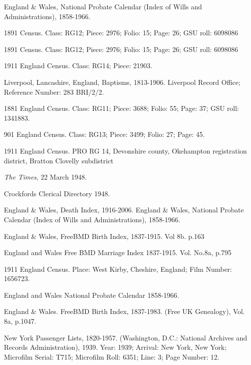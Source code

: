 \begin{thebibliography}{99}
	England \& Wales, National Probate Calendar (Index of Wills and Administrations), 1858-1966. 
	
	1891 Census.
	Class: RG12; Piece: 2976; Folio: 15; Page: 26; GSU roll: 6098086
	
	1891 Census. Class: RG12; Piece: 2976; Folio: 15; Page: 26; GSU roll: 6098086
	
	1911 England Census. Class: RG14; Piece: 21903.
	
	Liverpool, Lancashire, England, Baptisms, 1813-1906.
	Liverpool Record Office; Reference Number: 283 BRI/2/2.
	
	1881 England Census. Class: RG11; Piece: 3688; Folio: 55; Page: 37; GSU roll: 1341883.
	
	901 England Census. Class: RG13; Piece: 3499; Folio: 27; Page: 45.
	
	1911 England Census. PRO RG 14, Devonshire county, Okehampton registration district, 
	Bratton Clovelly subdistrict
	
	\emph{The Times}, 22 March 1948.

	 Crockfords Clerical Directory 1948. 
	 
	 England \& Wales, Death Index, 1916-2006.
	 England \& Wales, National Probate Calendar (Index of Wills and Administrations), 1858-1966. 
	 
	England \& Wales, FreeBMD Birth Index, 1837-1915. Vol 8b. p.163
	
	England and Wales Free BMD Marriage Index 1837-1915. Vol. No.8a, p.795
	
	1911 England Census. Place: West Kirby, Cheshire, England; Film Number: 1656723.

	England and Wales National Probate Calendar 1858-1966.
	
	England \& Wales. FreeBMD Birth Index, 1837-1983. (Free UK Genealogy), Vol. 8a, p.1047. 
	
	New York Passenger Lists, 1820-1957. (Washington, D.C.: National Archives and Records Administration), 1939.
	Year: 1939; Arrival: New York, New York; Microfilm Serial: T715; Microfilm Roll: 6351; Line: 3; Page Number: 12.


\end{thebibliography}
